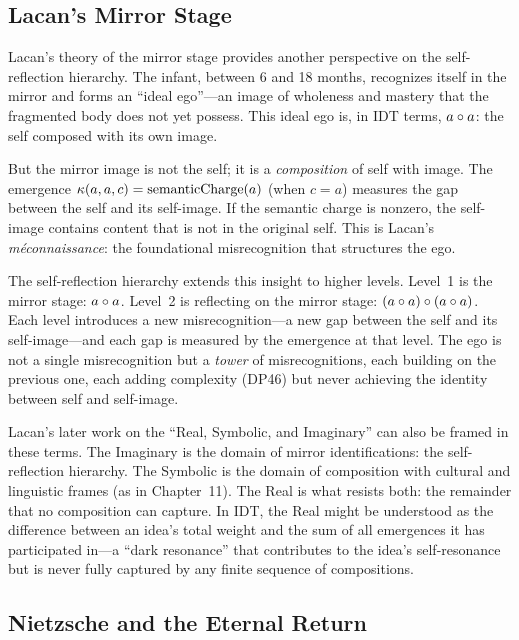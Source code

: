 \subsection{Lacan's Mirror Stage}

Lacan's theory of the mirror stage provides another perspective on the
self-reflection hierarchy.  The infant, between 6 and 18 months, recognizes
itself in the mirror and forms an ``ideal ego''---an image of wholeness and
mastery that the fragmented body does not yet possess.  This ideal ego
is, in IDT terms, $a \circ a$: the self composed with its own image.

But the mirror image is not the self; it is a \emph{composition} of self with
image.  The emergence $\kappa(a, a, c) = \mathrm{semanticCharge}(a)$ (when
$c = a$) measures the gap between the self and its self-image.  If the
semantic charge is nonzero, the self-image contains content that is not in the
original self.  This is Lacan's \emph{m\'econnaissance}: the foundational
misrecognition that structures the ego.

The self-reflection hierarchy extends this insight to higher levels.  Level~1
is the mirror stage: $a \circ a$.  Level~2 is reflecting on the mirror
stage: $(a \circ a) \circ (a \circ a)$.  Each level introduces
a new misrecognition---a new gap between the self and its self-image---and
each gap is measured by the emergence at that level.  The ego is not a single
misrecognition but a \emph{tower} of misrecognitions, each building on the
previous one, each adding complexity (DP46) but never achieving the identity
between self and self-image.

Lacan's later work on the ``Real, Symbolic, and Imaginary'' can also be
framed in these terms.  The Imaginary is the domain of mirror identifications:
the self-reflection hierarchy.  The Symbolic is the domain of composition
with cultural and linguistic frames (as in Chapter~11).  The Real is what
resists both: the remainder that no composition can capture.  In IDT, the
Real might be understood as the difference between an idea's total weight
and the sum of all emergences it has participated in---a ``dark resonance''
that contributes to the idea's self-resonance but is never fully captured
by any finite sequence of compositions.

\subsection{Nietzsche and the Eternal Return}

